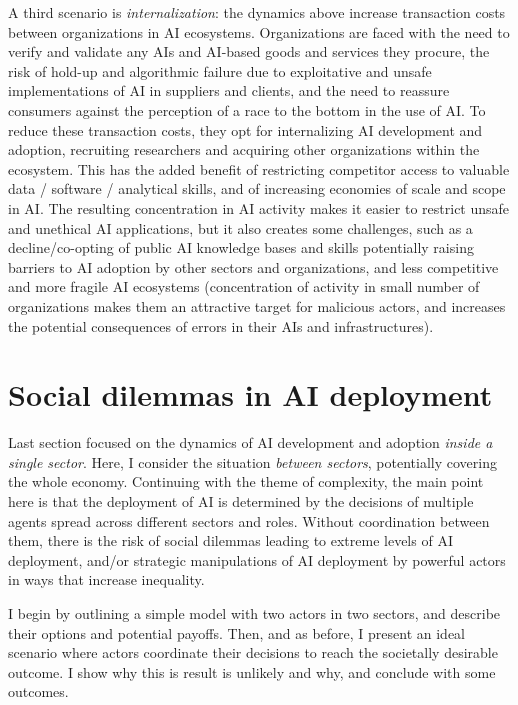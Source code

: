 \documentclass[11pt]{article}
\begin{document}
A third scenario is \textit{internalization}: the dynamics above increase transaction costs between organizations in AI ecosystems. Organizations are faced with the need to verify and validate any AIs and AI-based goods and services they procure, the risk of hold-up and algorithmic failure due to exploitative and unsafe implementations of AI in suppliers and clients, and the need to reassure consumers against the perception of a race to the bottom in the use of AI. To reduce these transaction costs, they opt for internalizing AI development and adoption, recruiting researchers and acquiring other organizations within the ecosystem. This has the added benefit of restricting competitor access to valuable data / software / analytical skills, and of increasing economies of scale and scope in AI. The resulting concentration in AI activity makes it easier to restrict unsafe and unethical AI applications, but it also creates some challenges, such as a decline/co-opting of public AI knowledge bases and skills potentially raising barriers to AI adoption by other sectors and organizations, and less competitive and more fragile AI ecosystems (concentration of activity in small number of organizations makes them an attractive target for malicious actors, and increases the potential consequences of errors in their AIs and infrastructures).

\section{Social dilemmas in AI deployment}
\label{sec:macro}

Last section focused on the dynamics of AI development and adoption \textit{inside a single sector}. Here, I consider the situation \textit{between sectors}, potentially covering the whole economy. Continuing with the theme of complexity, the main point here is that the deployment of AI is determined by the decisions of multiple agents spread across different sectors and roles. Without coordination between them, there is the risk of social dilemmas leading to extreme levels of AI deployment, and/or strategic manipulations of AI deployment by powerful actors in ways that increase inequality. 

I begin by outlining a simple model with two actors in two sectors, and describe their options and potential payoffs. Then, and as before, I present an ideal scenario where actors coordinate their decisions to reach the societally desirable outcome. I show why this is result is unlikely and why, and conclude with some outcomes. 
\end{document}
